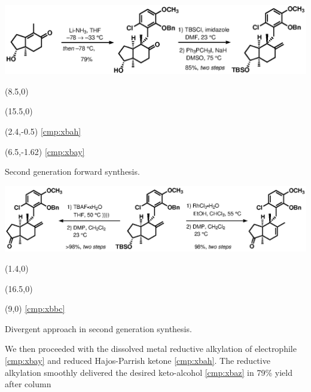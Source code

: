 \begin{Scheme}[h]
  \centering \includegraphics[scale=0.8]{chp_singlecarbon/images/forwardgentwo}
  \begin{textblock}{1}(8.5,0)  \end{textblock}
  \begin{textblock}{1}(15.5,0)  \end{textblock}
 \begin{textblock}{1}(2.4,-0.5) \textsf{\scriptsize{\ref{cmp:xbah}}} \end{textblock}
 \begin{textblock}{1}(6.5,-1.62) \textsf{\scriptsize{\ref{cmp:xbay}}} \end{textblock}
  \caption{Second generation forward synthesis.}
  \label{sch:forwardgentwo}
\end{Scheme}
\begin{Scheme}[b]
  \centering \includegraphics[scale=0.8]{chp_singlecarbon/images/forwardgentwodiverge}
  \begin{textblock}{1}(1.4,0)  \end{textblock}
  \begin{textblock}{1}(16.5,0)  \end{textblock}
 \begin{textblock}{1}(9,0) \textsf{\scriptsize{\ref{cmp:xbbc}}} \end{textblock}
  \caption{Divergent approach in second generation synthesis.}
  \label{sch:forwardgentwodiverge}
\end{Scheme}
We then proceeded with the dissolved metal reductive alkylation of
electrophile \ref{cmp:xbay} and reduced Hajos-Parrish ketone \ref{cmp:xbah}. The reductive
alkylation smoothly delivered the desired keto-alcohol \ref{cmp:xbaz} in 79\% yield after column
